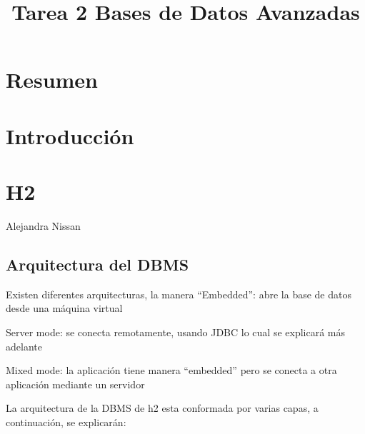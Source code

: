 \documentclass{acmart}
\title{Tarea 2 Bases de Datos Avanzadas}
\begin{document}
\maketitle

\tableofcontents

\section{Resumen}

\section{Introducción}
\section{H2}

Alejandra Nissan 



\subsection{Arquitectura del DBMS}

Existen diferentes arquitecturas, la manera “Embedded”: abre la base de datos desde una máquina virtual





Server mode: se conecta remotamente, usando JDBC lo cual se explicará más adelante

 



Mixed mode: la aplicación tiene manera “embedded” pero se conecta a otra aplicación mediante un servidor

  





La arquitectura de la DBMS de h2 esta conformada por varias capas, a continuación, se explicarán:
\end{document}
